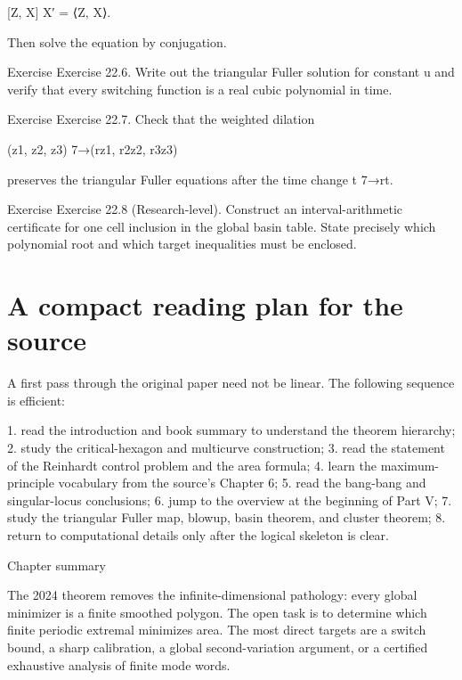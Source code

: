 [Z, X] X′ = ⟨Z, X⟩.


Then solve the equation by conjugation.


\begin{statementbox}{Exercise}
Exercise 22.6. Write out the triangular Fuller solution for constant u and verify that every switching function is a real cubic polynomial in time.
\end{statementbox}

\begin{statementbox}{Exercise}
Exercise 22.7. Check that the weighted dilation
\end{statementbox}

(z1, z2, z3) 7→(rz1, r2z2, r3z3)


preserves the triangular Fuller equations after the time change t 7→rt.


\begin{statementbox}{Exercise}
Exercise 22.8 (Research-level). Construct an interval-arithmetic certificate for one cell inclusion in the global basin table. State precisely which polynomial root and which target inequalities must be enclosed.
\end{statementbox}

\section{A compact reading plan for the source}

A first pass through the original paper need not be linear. The following sequence is efficient:


1. read the introduction and book summary to understand the theorem hierarchy; 2. study the critical-hexagon and multicurve construction; 3. read the statement of the Reinhardt control problem and the area formula; 4. learn the maximum-principle vocabulary from the source’s Chapter 6; 5. read the bang-bang and singular-locus conclusions; 6. jump to the overview at the beginning of Part V; 7. study the triangular Fuller map, blowup, basin theorem, and cluster theorem; 8. return to computational details only after the logical skeleton is clear.


\begin{insightbox}{Chapter summary}
\end{insightbox}

The 2024 theorem removes the infinite-dimensional pathology: every global minimizer is a finite smoothed polygon. The open task is to determine which finite periodic extremal minimizes area. The most direct targets are a switch bound, a sharp calibration, a global second-variation argument, or a certified exhaustive analysis of finite mode words.

